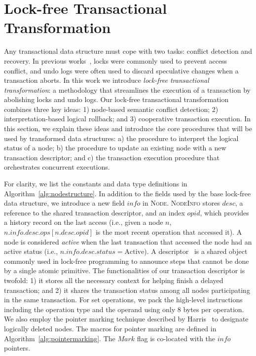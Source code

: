 \documentclass{sig-alternate-05-2015}
\begin{document}
\section{Lock-free Transactional Transformation}
\label{sec:algorithm}
Any transactional data structure must cope with two tasks: conflict detection and recovery.
In previous works~\cite{herlihy2008transactional,golan2015automatic}, locks were commonly used to prevent access conflict, and undo logs were often used to discard speculative changes when a transaction aborts.
In this work we introduce \emph{lock-free transactional transformation}: a methodology that streamlines the execution of a transaction by abolishing locks and undo logs.
Our lock-free transactional transformation combines three key ideas: 1) node-based semantic conflict detection; 2) interpretation-based logical rollback; and 3) cooperative transaction execution.
In this section, we explain these ideas and introduce the core procedures that will be used by transformed data structures: a) the procedure to interpret the logical status of a node; b) the procedure to update an existing node with a new transaction descriptor; and c) the transaction execution procedure that orchestrates concurrent executions.

For clarity, we list the constants and data type definitions in Algorithm~\ref{alg:nodestructure}.
In addition to the fields used by the base lock-free data structure, we introduce a new field $info$ in \textsc{Node}.
\textsc{NodeInfo} stores $desc$, a reference to the shared transaction descriptor, and an index $opid$, which provides a history record on the last access (i.e., given a node $n$, $n.info.desc.ops[n.desc.opid]$ is the most recent operation that accessed it).
A node is considered \emph{active} when the last transaction that accessed the node had an active status (i.e., $n.info.desc.status=\text{Active}$).
A descriptor~\cite{herlihy2012art} is a shared object commonly used in lock-free programming to announce steps that cannot be done by a single atomic primitive.
The functionalities of our transaction descriptor is twofold: 1) it stores all the necessary context for helping finish a delayed transaction; and 2) it shares the transaction status among all nodes participating in the same transaction.
For set operations, we pack the high-level instructions including the operation type and the operand using only 8 bytes per operation.
We also employ the pointer marking technique described by Harris~\cite{harris2001pragmatic} to designate logically deleted nodes. 
The macros for pointer marking are defined in Algorithm~\ref{alg:pointermarking}.
The $Mark$ flag is co-located with the $info$ pointers.
\end{document}

